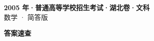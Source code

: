 \documentclass[zihao=-4, a4paper]{ctexart}
\begin{document}
\begin{center}
  {\Large\bfseries 2005 年·普通高等学校招生考试·湖北卷·文科}\\[4pt]
  {\large 数学 · 简答版}
\end{center}
\medskip
{}

\clearpage
{}
\begin{center}{\Large\bfseries 答案速查}\end{center}
\medskip

\end{document}
